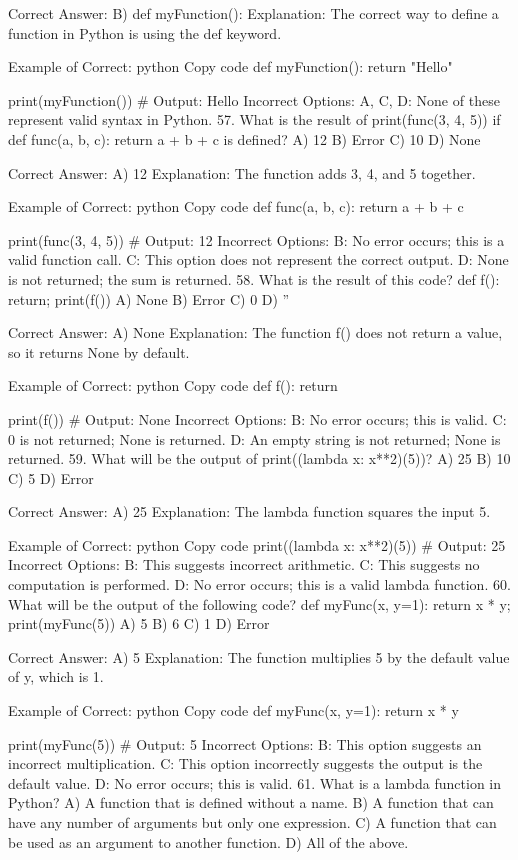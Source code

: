 Correct Answer: B) def myFunction():
Explanation: The correct way to define a function in Python is using the def keyword.

Example of Correct:
python
Copy code
def myFunction():
    return "Hello"

print(myFunction())  # Output: Hello
Incorrect Options:
A, C, D: None of these represent valid syntax in Python.
57. What is the result of print(func(3, 4, 5)) if def func(a, b, c): return a + b + c is defined?
A) 12
B) Error
C) 10
D) None

Correct Answer: A) 12
Explanation: The function adds 3, 4, and 5 together.

Example of Correct:
python
Copy code
def func(a, b, c):
    return a + b + c

print(func(3, 4, 5))  # Output: 12
Incorrect Options:
B: No error occurs; this is a valid function call.
C: This option does not represent the correct output.
D: None is not returned; the sum is returned.
58. What is the result of this code? def f(): return; print(f())
A) None
B) Error
C) 0
D) ''

Correct Answer: A) None
Explanation: The function f() does not return a value, so it returns None by default.

Example of Correct:
python
Copy code
def f():
    return

print(f())  # Output: None
Incorrect Options:
B: No error occurs; this is valid.
C: 0 is not returned; None is returned.
D: An empty string is not returned; None is returned.
59. What will be the output of print((lambda x: x**2)(5))?
A) 25
B) 10
C) 5
D) Error

Correct Answer: A) 25
Explanation: The lambda function squares the input 5.

Example of Correct:
python
Copy code
print((lambda x: x**2)(5))  # Output: 25
Incorrect Options:
B: This suggests incorrect arithmetic.
C: This suggests no computation is performed.
D: No error occurs; this is a valid lambda function.
60. What will be the output of the following code? def myFunc(x, y=1): return x * y; print(myFunc(5))
A) 5
B) 6
C) 1
D) Error

Correct Answer: A) 5
Explanation: The function multiplies 5 by the default value of y, which is 1.

Example of Correct:
python
Copy code
def myFunc(x, y=1):
    return x * y

print(myFunc(5))  # Output: 5
Incorrect Options:
B: This option suggests an incorrect multiplication.
C: This option incorrectly suggests the output is the default value.
D: No error occurs; this is valid.
61. What is a lambda function in Python?
A) A function that is defined without a name.
B) A function that can have any number of arguments but only one expression.
C) A function that can be used as an argument to another function.
D) All of the above.

